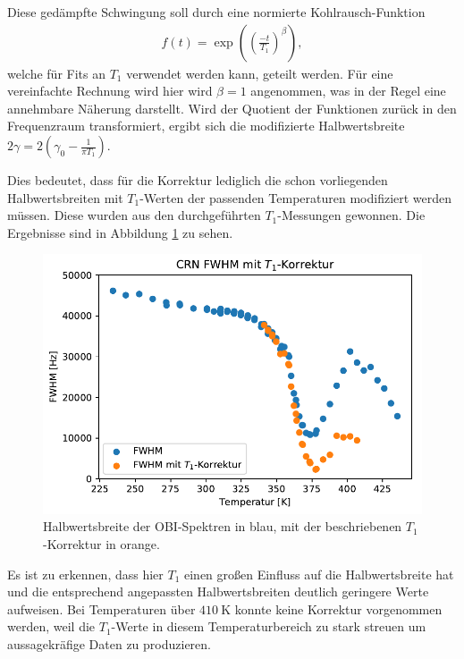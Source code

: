 Diese gedämpfte Schwingung soll durch eine normierte Kohlrausch-Funktion
\begin{align}
	f(t) = \exp{\left( {\left(\frac{-t}{T_1} \right)}^\beta \right) },
\end{align}
welche für Fits an $T_1$ verwendet werden kann, geteilt werden. Für eine vereinfachte Rechnung wird hier wird $\beta = 1$ angenommen, was in der Regel eine annehmbare Näherung darstellt. Wird der Quotient der Funktionen zurück in den Frequenzraum transformiert, ergibt sich die modifizierte Halbwertsbreite $2\gamma = 2(\gamma_0 - \frac{1}{\pi T_1})$.

Dies bedeutet, dass für die Korrektur lediglich die schon vorliegenden Halbwertsbreiten mit $T_1$-Werten der passenden Temperaturen modifiziert werden müssen. Diese wurden aus den durchgeführten $T_1$-Messungen gewonnen. Die Ergebnisse sind in Abbildung \ref{fig:res:spek_fwhm_t1} zu sehen.
\begin{figure}
	\begin{center}
		\includegraphics[width=.9\textwidth]{graphics/plots/SPEK/spek_t1korr.pdf}
	\end{center}
	\caption{Halbwertsbreite der OBI-Spektren in blau, mit der beschriebenen $T_1$-Korrektur in orange.} \label{fig:res:spek_fwhm_t1}
\end{figure}

Es ist zu erkennen, dass hier $T_1$ einen großen Einfluss auf die Halbwertsbreite hat und die entsprechend angepassten Halbwertsbreiten deutlich geringere Werte aufweisen. Bei Temperaturen über $\SI{410}{\kelvin}$ konnte keine Korrektur vorgenommen werden, weil die $T_1$-Werte in diesem Temperaturbereich zu stark streuen um aussagekräfige Daten zu produzieren.




